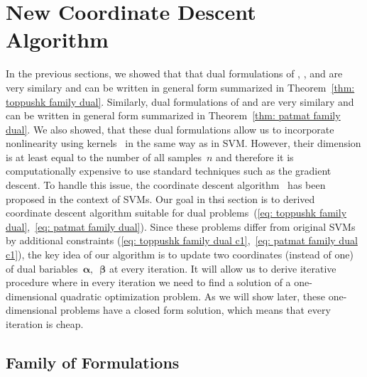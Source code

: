 \section{New Coordinate Descent Algorithm}\label{sec: coordinate descent}

In the previous sections, we showed that that dual formulations of \TopPush, \TopPushK, \TopMeanK and \tauFPL are very similary and can be written in general form summarized in Theorem~\ref{thm: toppushk family dual}. Similarly, dual formulations of \PatMat and \PatMatNP are very similary and can be written in general form summarized in Theorem~\ref{thm: patmat family dual}. We also showed, that these dual formulations  allow us to incorporate nonlinearity using kernels~\cite{scholkopf2001learning} in the same way as in SVM. However, their dimension is at least equal to the number of all samples~$n$ and therefore it is computationally expensive to use standard techniques such as the gradient descent. To handle this issue, the coordinate descent algorithm~\cite{chang2008coordinate,hsieh2008dual} has been proposed in the context of SVMs. Our goal in thsi section is to derived coordinate descent algorithm suitable for dual problems~(\ref{eq: toppushk family dual},~\ref{eq: patmat family dual}). Since these problems differ from original SVMs by additional constraints (\ref{eq: toppushk family dual c1},~\ref{eq: patmat family dual c1}), the key idea of our algorithm is to update two coordinates (instead of one) of dual bariables~$\bm{\alpha},$~$\bm{\beta}$ at every iteration. It will allow us to derive iterative procedure where in every iteration we need to find a solution of a one-dimensional quadratic optimization problem. As we will show later, these one-dimensional problems have a closed form solution, which means that every iteration is cheap.

\subsection{Family of \TopPushK Formulations}\label{sec: Top coordinate descent}

